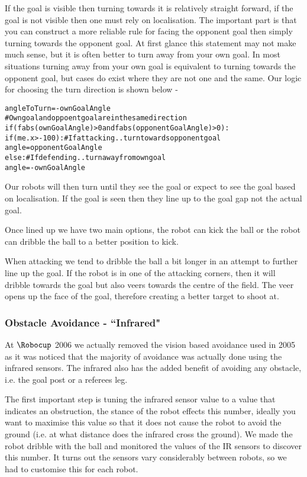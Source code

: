 If the goal is visible then turning towards it is relatively
straight forward, if the goal is not visible then one must rely on
localisation. The important part is that you can construct a more
reliable rule for facing the opponent goal then simply turning
towards the opponent goal. At first glance this statement may not
make much sense, but it is often better to turn away from your own
goal. In most situations turning away from your own goal is
equivalent to turning towards the opponent goal, but cases do exist
where they are not one and the same. Our logic for choosing the turn
direction is shown below -
\begin{alltt}
  angleToTurn = -ownGoalAngle
  # Own goal and oppoent goal are in the same direction
  if (fabs(ownGoalAngle) > 0 and fabs(opponentGoalAngle) > 0):
    if (me.x > -100): # If attacking .. turn towards opponent goal
      angle = opponentGoalAngle
    else: # If defending .. turn away from own goal
      angle = -ownGoalAngle
\end{alltt}

Our robots will then turn until they see the goal or expect to see
the goal based on localisation. If the goal is seen then they line
up to the goal gap not the actual goal.

Once lined up we have two main options, the robot can kick the ball
or the robot can dribble the ball to a better position to kick.

When attacking we tend to dribble the ball a bit longer in an
attempt to further line up the goal. If the robot is in one of the attacking corners, then it will dribble towards the goal but also veers towards the centre of the field. The veer opens up the face of the goal, therefore creating a better target to shoot at.

\subsubsection{Obstacle Avoidance - ``Infrared"}

At $\Robocup$ 2006 we actually removed the vision based avoidance used in 2005 as it was noticed that the majority of avoidance was actually done using the infrared sensors. The infrared also has the added benefit of avoiding any obstacle,
i.e. the goal post or a referees leg. 

The first important step is tuning the infrared sensor value to a
value that indicates an obstruction, the stance of the robot effects
this number, ideally you want to maximise this value so that it does
not cause the robot to avoid the ground (i.e. at what distance does
the infrared cross the ground). We made the robot dribble with the
ball and monitored the values of the IR sensors to discover this
number. It turns out the sensors vary considerably between robots,
so we had to customise this for each robot.

